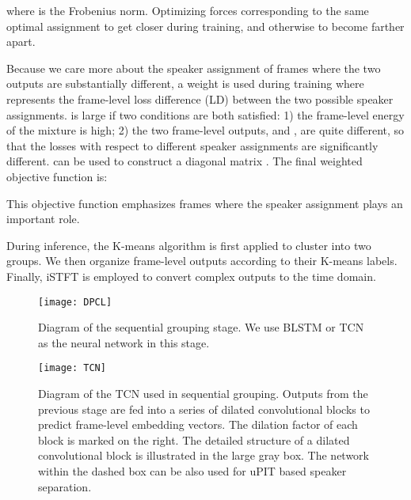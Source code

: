 \documentclass[journal]{IEEEtran}
\begin{document}
where  is the Frobenius norm.
Optimizing  forces  corresponding to the same optimal assignment to get closer during training, and otherwise to become farther apart.


Because we care more about the speaker assignment of frames where the two outputs are substantially different, a weight  is used during training
where  represents the frame-level loss difference (LD) between the two possible speaker assignments.
  is large if two conditions are both satisfied:
 1) the frame-level energy of the mixture is high;
 2) the two frame-level outputs,  and , are quite different, so that the losses with respect to different speaker assignments are significantly different. 
 can be used to construct a diagonal matrix .
The final weighted objective function is:

This objective function emphasizes frames where the speaker assignment plays an important role.


During inference, the K-means algorithm is first applied to cluster  into two groups.
We then organize frame-level outputs according to their K-means labels. Finally, iSTFT is employed to convert complex outputs to the time domain.



\begin{figure}[]
\begin{minipage}[a]{\linewidth}
      \centering
      \centerline{\texttt{[image: DPCL]}}
    \medskip
    \end{minipage}
\caption{Diagram of the sequential grouping stage. We use BLSTM or TCN as the neural network in this stage.}
    \label{fig:sg}
\end{figure}
    
        
    \begin{figure*}[]
\begin{minipage}[a]{\linewidth}
      \centering
      \centerline{\texttt{[image: TCN]}}
    \medskip
    \end{minipage}
\caption{Diagram of the TCN used in sequential grouping. Outputs from the previous stage are fed into a series of dilated convolutional blocks to predict frame-level embedding vectors. The dilation factor of each block is marked on the right. The detailed structure of a dilated convolutional block is illustrated in the large gray box. The network within the dashed box can be also used for uPIT based speaker separation.}
    \label{fig:TCN}
\end{figure*}
    
\end{document}
